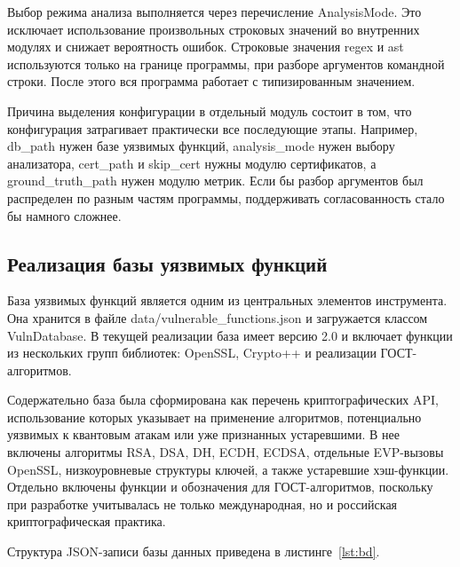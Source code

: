 \documentclass{itmo-vkr}
\begin{document}
	Выбор режима анализа выполняется через перечисление AnalysisMode. Это исключает использование произвольных строковых значений во внутренних модулях и снижает вероятность ошибок. Строковые значения regex и ast используются только на границе программы, при разборе аргументов командной строки. После этого вся программа работает с типизированным значением.
	
	Причина выделения конфигурации в отдельный модуль состоит в том, что конфигурация затрагивает практически все последующие этапы. Например, db\_path нужен базе уязвимых функций, analysis\_mode нужен выбору анализатора, cert\_path и skip\_cert нужны модулю сертификатов, а ground\_truth\_path нужен модулю метрик. Если бы разбор аргументов был распределен по разным частям программы, поддерживать согласованность стало бы намного сложнее.
	
	\subsection{Реализация базы уязвимых функций}
	
	База уязвимых функций является одним из центральных элементов инструмента. Она хранится в файле data/vulnerable\_functions.json и загружается классом VulnDatabase. В текущей реализации база имеет версию 2.0 и включает функции из нескольких групп библиотек: OpenSSL, Crypto++ и реализации ГОСТ-алгоритмов.
	
	Содержательно база была сформирована как перечень криптографических API, использование которых указывает на применение алгоритмов, потенциально уязвимых к квантовым атакам или уже признанных устаревшими. В нее включены алгоритмы RSA, DSA, DH, ECDH, ECDSA, отдельные EVP-вызовы OpenSSL, низкоуровневые структуры ключей, а также устаревшие хэш-функции. Отдельно включены функции и обозначения для ГОСТ-алгоритмов, поскольку при разработке учитывалась не только международная, но и российская криптографическая практика.
	
	Структура JSON-записи базы данных приведена в листинге~\ref{lst:bd}.
\end{document}
